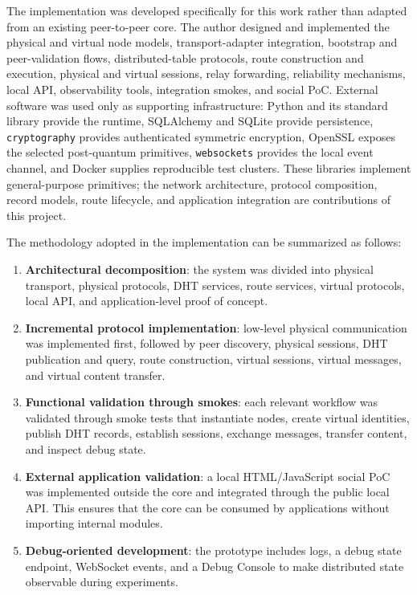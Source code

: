 \documentclass[12pt,a4paper]{article}
\begin{document}
The implementation was developed specifically for this work rather than adapted from an existing peer-to-peer core. The author designed and implemented the physical and virtual node models, transport-adapter integration, bootstrap and peer-validation flows, distributed-table protocols, route construction and execution, physical and virtual sessions, relay forwarding, reliability mechanisms, local API, observability tools, integration smokes, and social PoC. External software was used only as supporting infrastructure: Python and its standard library provide the runtime, SQLAlchemy and SQLite provide persistence, \texttt{cryptography} provides authenticated symmetric encryption, OpenSSL exposes the selected post-quantum primitives, \texttt{websockets} provides the local event channel, and Docker supplies reproducible test clusters. These libraries implement general-purpose primitives; the network architecture, protocol composition, record models, route lifecycle, and application integration are contributions of this project.

The methodology adopted in the implementation can be summarized as follows:

\begin{enumerate}
    \item \textbf{Architectural decomposition}: the system was divided into physical transport, physical protocols, DHT services, route services, virtual protocols, local API, and application-level proof of concept.
    
    \item \textbf{Incremental protocol implementation}: low-level physical communication was implemented first, followed by peer discovery, physical sessions, DHT publication and query, route construction, virtual sessions, virtual messages, and virtual content transfer.
    
    \item \textbf{Functional validation through smokes}: each relevant workflow was validated through smoke tests that instantiate nodes, create virtual identities, publish DHT records, establish sessions, exchange messages, transfer content, and inspect debug state.
    
    \item \textbf{External application validation}: a local HTML/JavaScript social PoC was implemented outside the core and integrated through the public local API. This ensures that the core can be consumed by applications without importing internal modules.
    
    \item \textbf{Debug-oriented development}: the prototype includes logs, a debug state endpoint, WebSocket events, and a Debug Console to make distributed state observable during experiments.
\end{enumerate}
\end{document}
